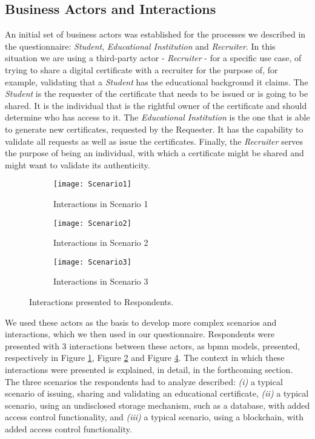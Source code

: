 \subsection{Business Actors and Interactions}

An initial set of business actors was established for the processes we described in the questionnaire: \textit{Student}, \textit{Educational Institution} and \textit{Recruiter}. In this situation we are using a third-party actor - \textit{Recruiter} - for a specific use case, of trying to share a digital certificate with a recruiter for the purpose of, for example, validating that a \textit{Student} has the educational background it claims. The \textit{Student} is the requester of the certificate that needs to be issued or is going to be shared. It is the individual that is the rightful owner of the certificate and should determine who has access to it. The \textit{Educational Institution} is the one that is able to generate new certificates, requested by the Requester. It has the capability to validate all requests as well as issue the certificates. Finally, the \textit{Recruiter} serves the purpose of being an individual, with which a certificate might be shared and might want to validate its authenticity.

\begin{figure}[htb]
	\centering
	\begin{subfigure}[b]{0.3\textwidth}
		\centering
		\texttt{[image: Scenario1]}
		\caption{Interactions in Scenario 1}
		\label{fig: Scenario1}
	\end{subfigure}
	\begin{subfigure}[b]{0.3\textwidth}
		\centering
		\texttt{[image: Scenario2]}
		\caption{Interactions in Scenario 2}
		\label{fig: Scenario2}
	\end{subfigure}
	\begin{subfigure}[b]{0.3\textwidth}
		\centering
		\texttt{[image: Scenario3]}
		\caption{Interactions in Scenario 3}
		\label{fig: Scenario3}
	\end{subfigure}

	\caption{Interactions presented to Respondents.}
\end{figure}

We used these actors as the basis to develop more complex scenarios and interactions, which we then used in our questionnaire. Respondents were presented with 3 interactions between these actors, as \gls{bpmn} \cite{BPMN} models, presented, respectively in Figure \ref{fig: Scenario1}, Figure \ref{fig: Scenario2} and Figure \ref{fig: Scenario3}. The context in which these interactions were presented is explained, in detail, in the forthcoming section. The three scenarios the respondents had to analyze described:
\emph{(i)} a typical scenario of issuing, sharing and validating an educational certificate, \emph{(ii)} a typical scenario, using an undisclosed storage mechanism, such as a database, with added access control functionality, and \emph{(iii)} a typical scenario, using a blockchain, with added access control functionality.



